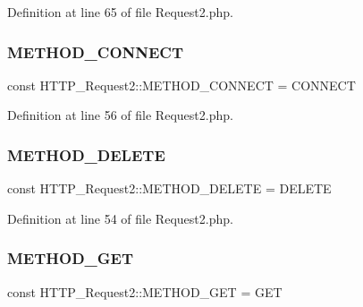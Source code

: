Definition at line 65 of file Request2.\+php.

\hypertarget{classHTTP__Request2_af03c573103c3f5bdf3ec9c3e95a08e59}{}\label{classHTTP__Request2_af03c573103c3f5bdf3ec9c3e95a08e59} 
\subsubsection{\texorpdfstring{M\+E\+T\+H\+O\+D\+\_\+\+C\+O\+N\+N\+E\+CT}{METHOD\_CONNECT}}
{\footnotesize\ttfamily const H\+T\+T\+P\+\_\+\+Request2\+::\+M\+E\+T\+H\+O\+D\+\_\+\+C\+O\+N\+N\+E\+CT = \textquotesingle{}C\+O\+N\+N\+E\+CT\textquotesingle{}}



Definition at line 56 of file Request2.\+php.

\hypertarget{classHTTP__Request2_ab6edf309179aa4535aa6a9b12b260978}{}\label{classHTTP__Request2_ab6edf309179aa4535aa6a9b12b260978} 
\subsubsection{\texorpdfstring{M\+E\+T\+H\+O\+D\+\_\+\+D\+E\+L\+E\+TE}{METHOD\_DELETE}}
{\footnotesize\ttfamily const H\+T\+T\+P\+\_\+\+Request2\+::\+M\+E\+T\+H\+O\+D\+\_\+\+D\+E\+L\+E\+TE = \textquotesingle{}D\+E\+L\+E\+TE\textquotesingle{}}



Definition at line 54 of file Request2.\+php.

\hypertarget{classHTTP__Request2_a7c1f37cc2543c9d0fe5f09086bd50b3a}{}\label{classHTTP__Request2_a7c1f37cc2543c9d0fe5f09086bd50b3a} 
\subsubsection{\texorpdfstring{M\+E\+T\+H\+O\+D\+\_\+\+G\+ET}{METHOD\_GET}}
{\footnotesize\ttfamily const H\+T\+T\+P\+\_\+\+Request2\+::\+M\+E\+T\+H\+O\+D\+\_\+\+G\+ET = \textquotesingle{}G\+ET\textquotesingle{}}



